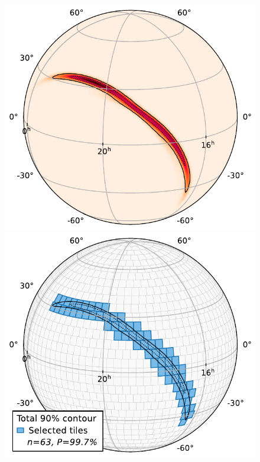 \begin{colsection}
\begin{figure}[p]
    \begin{center}
        \includegraphics[width=0.49\linewidth]{images/tiling/S190521r_1.pdf}
        \includegraphics[width=0.49\linewidth]{images/tiling/S190521r_2.pdf}

        \vspace{0.5cm}


\end{center}
\end{figure}
\end{colsection}
